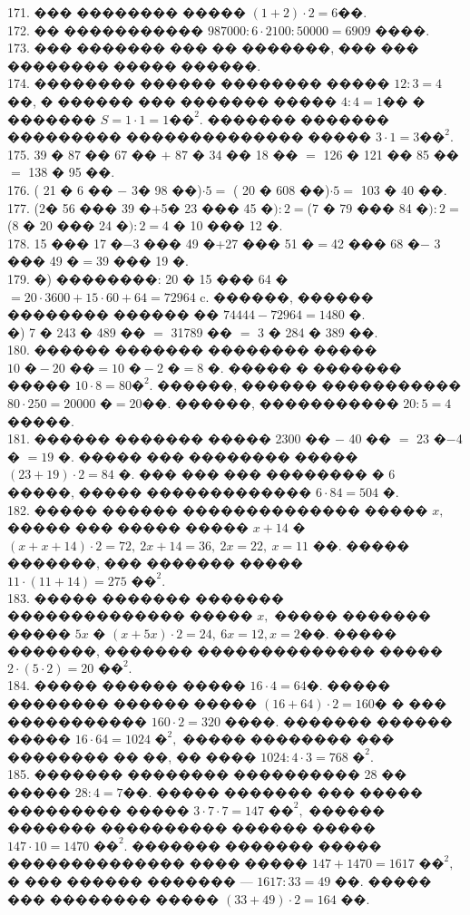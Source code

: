 \documentclass[12pt]{article}
\begin{document}
171. ��� �������� ����� $(1+2)\cdot2=6$��.\\
172. �� ����������� $987000:6\cdot2100:50000=6909$ ����.\\
173. ��� ������� ��� �� �������, ��� ��� �������� ����� ������.\\
174. �������� ������ �������� ����� $12:3=4$��, � ������ ��� ������� ����� $4:4=1$�� � ������� $S=1\cdot1=1\text{��}^2.$ ������� ������� ��������� �������������� ����� $3\cdot1=3\text{��}^2.$\\
175. 39 � 87 �� 67 �� $+$ 87 � 34 �� 18 �� $=$ 126 � 121 �� 85 �� $=$ 138 � 95 ��.\\
176. ( 21 � 6 �� $-$ 3� 98 ��)$\cdot5=$ ( 20 � 608 ��)$\cdot5=$ 103 � 40 ��.\\
177. (2� 56 ��� 39 �$+$5� 23 ��� 45 �$):2=$(7 � 79 ��� 84 �$):2=$ (8 � 20 ��� 24 �$):2=$4 � 10 ��� 12 �.\\
178. 15 ��� 17 �$-$3 ��� 49 �+27 ��� 51 �$=$42 ��� 68 �$-$ 3 ��� 49 �$=$39 ��� 19 �.\\
179. �) ��������: 20 � 15 ��� 64 �$=20\cdot3600+15\cdot60+64=72964$ c. ������, ������ �������� ������ �� $74444-72964=1480$ �.\\
�) 7 � 243 � 489 �� $=$ 31789 �� $=$ 3 � 284 � 389 ��.\\
180. ������ ������� �������� ����� $10\text{ �}-20 \text{ ��}=10\text{ �}-2\text{ �}=8\text{ �}.$ ����� � ������� ����� $10\cdot8=80\text{�}^2.$ ������, ������ ����������� $80\cdot250=20000\text{ �}=20$��. ������, ����������� $20:5=4$ �����.\\
181. ������ ������� ����� 2300 �� $-$ 40 �� $=$ 23 �$-$4 � $=19$ �. ����� ��� �������� ����� $(23+19)\cdot2=84$ �. ��� ��� ��� �������� � 6 �����, ����� ������������� $6\cdot84=504$ �.\\
182. ����� ������ �������������� ����� $x,$ ����� ��� ����� ����� $x+14$ � $(x+x+14)\cdot2=72,\ 2x+14=36,\ 2x=22,\ x=11$ ��. ����� �������, ��� ������� ����� $11\cdot(11+14)=275\text{ ��}^2.$\\
183. ����� ������� ������� �������������� ����� $x,$ ����� ������� ����� $5x$ � $(x+5x)\cdot2=24,\ 6x=12, x=2$��. ����� �������, ������� �������������� ����� $2\cdot(5\cdot2)=20\text{ ��}^2.$\\
184. ����� ������ ����� $16\cdot4=64$�. ����� �������� ������ ����� $(16+64)\cdot2=160$� � ��� ����������� $160\cdot2=320$ ����. ������� ������ ����� $16\cdot64=1024\text{ �}^2,$ ����� �������� ��� �������� �� ��, �� ���� $1024:4\cdot3=768\text{ �}^2.$\\
185. ������� �������� ���������� 28 �� ����� $28:4=7$��. ����� ������� ��� ����� ��������� ����� $3\cdot7\cdot7=147\text{ ��}^2,$ ������ ������� ���������� ������ ����� $147\cdot10=1470\text{ ��}^2.$ ������� ������� ����� �������������� ���� ����� $147+1470=1617\text{ ��}^2,$ � ��� ������ ������� --- $1617:33=49$ ��. ����� ��� �������� ����� $(33+49)\cdot2=164$ ��.\\
\end{document}
